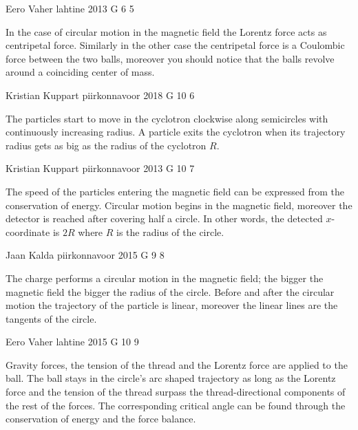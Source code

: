 \documentclass[11pt]{article}
\begin{document}
{Eero Vaher} %
{lahtine} %
{2013} %
{G 6} %
{5} %
{

\ifEngHint
In the case of circular motion in the magnetic field the Lorentz force acts as centripetal force. Similarly in the other case the centripetal force is a Coulombic force between the two balls, moreover you should notice that the balls revolve around a coinciding center of mass.
\fi
}

{Kristian Kuppart} %
{piirkonnavoor} %
{2018} %
{G 10} %
{6} %
{

\ifEngHint
The particles start to move in the cyclotron clockwise along semicircles with continuously increasing radius. A particle exits the cyclotron when its trajectory radius gets as big as the radius of the cyclotron $R$.
\fi
}

{Kristian Kuppart} %
{piirkonnavoor} %
{2013} %
{G 10} %
{7} %
{

\ifEngHint
The speed of the particles entering the magnetic field can be expressed from the conservation of energy. Circular motion begins in the magnetic field, moreover the detector is reached after covering half a circle. In other words, the detected $x$-coordinate is $2R$ where $R$ is the radius of the circle.
\fi
}

{Jaan Kalda} %
{piirkonnavoor} %
{2015} %
{G 9} %
{8} %
{

\ifEngHint
The charge performs a circular motion in the magnetic field; the bigger the magnetic field the bigger the radius of the circle. Before and after the circular motion the trajectory of the particle is linear, moreover the linear lines are the tangents of the circle.
\fi
}

{Eero Vaher} %
{lahtine} %
{2015} %
{G 10} %
{9} %
{

\ifEngHint
Gravity forces, the tension of the thread and the Lorentz force are applied to the ball. The ball stays in the circle’s arc shaped trajectory as long as the Lorentz force and the tension of the thread surpass the thread-directional components of the rest of the forces. The corresponding critical angle can be found through the conservation of energy and the force balance.
\fi
}
\end{document}
